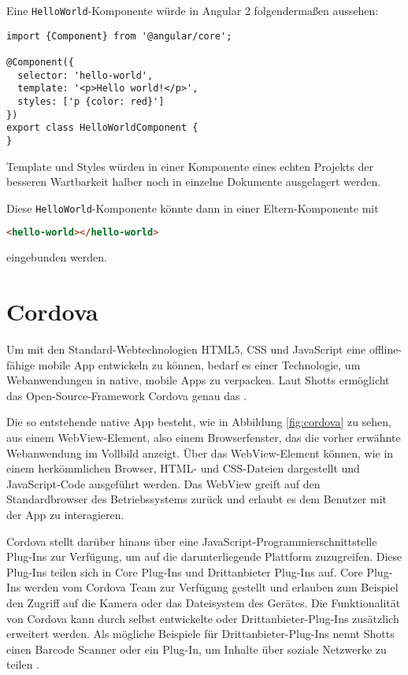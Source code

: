 Eine \texttt{HelloWorld}-Komponente würde in Angular 2 folgendermaßen aussehen:
\begin{codebox}
\begin{lstlisting}[style=typescript]
import {Component} from '@angular/core';

@Component({
  selector: 'hello-world',
  template: '<p>Hello world!</p>',
  styles: ['p {color: red}']
})
export class HelloWorldComponent {
}
\end{lstlisting}
\end{codebox}

Template und Styles würden in einer Komponente eines echten Projekts der besseren Wartbarkeit halber noch in einzelne Dokumente ausgelagert werden.

Diese \texttt{HelloWorld}-Komponente könnte dann in einer Eltern-Komponente mit
\begin{codebox}
\begin{lstlisting}[language=HTML]
<hello-world></hello-world>
\end{lstlisting}
\end{codebox}
eingebunden werden.

\section{Cordova}
Um mit den Standard-Webtechnologien HTML5, CSS und JavaScript eine offline-fähige mobile App entwickeln zu können, bedarf es einer Technologie, um Webanwendungen in native, mobile Apps zu verpacken. Laut Shotts ermöglicht das Open-Source-Framework Cordova genau das \cite{shotts:phonegap}.

Die so entstehende native App besteht, wie in Abbildung \ref{fig:cordova} zu sehen, aus einem WebView-Element, also einem Browserfenster, das die vorher erwähnte Webanwendung im Vollbild anzeigt. Über das WebView-Element können, wie in einem herkömmlichen Browser, HTML- und CSS-Dateien dargestellt und JavaScript-Code ausgeführt werden. Das WebView greift auf den Standardbrowser des Betriebssystems zurück und erlaubt es dem Benutzer mit der App zu interagieren.

Cordova stellt darüber hinaus über eine JavaScript-Programmierschnittstelle Plug-Ins zur Verfügung, um auf die darunterliegende Plattform zuzugreifen. Diese Plug-Ins teilen sich in Core Plug-Ins und Drittanbieter Plug-Ins auf. Core Plug-Ins werden vom Cordova Team zur Verfügung gestellt und erlauben zum Beispiel den Zugriff auf die Kamera oder das Dateisystem des Gerätes. Die Funktionalität von Cordova kann durch selbst entwickelte oder Drittanbieter-Plug-Ins zusätzlich erweitert werden. Als mögliche Beispiele für Drittanbieter-Plug-Ins nennt Shotts einen Barcode Scanner oder ein Plug-In, um Inhalte über soziale Netzwerke zu teilen \cite{shotts:phonegap}.

